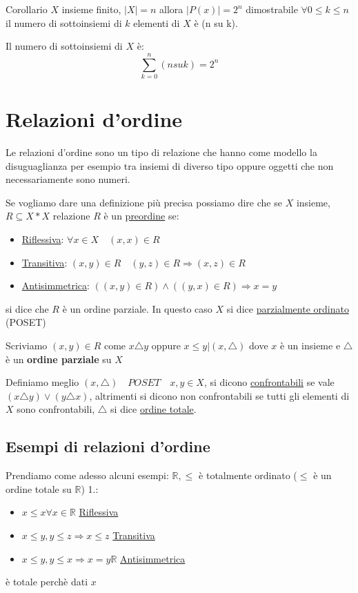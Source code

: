 \documentclass{article}
\theoremstyle{definition}
\begin{document}
Corollario $X$ insieme finito, $|X| = n$ allora $|P(x)| = 2^n$ dimostrabile $\forall 0 \le k \le n$ il numero di sottoinsiemi di $k$ elementi di $X$ è (n su k). \par
Il numero di sottoinsiemi di $X$ è: 
\begin{equation*}
        \sum_{k=0}^{n}(n su k) = 2^n
\end{equation*}






\newpage
\section{Relazioni d'ordine}
Le relazioni d'ordine sono un tipo di relazione che hanno come modello la disuguaglianza per esempio tra insiemi di diverso tipo oppure oggetti che non necessariamente sono numeri. \par
Se vogliamo dare una definizione più precisa possiamo dire che se $ X $  insieme, $ R \subseteq X * X $ relazione $ R $ è un \underline{preordine} se:
\begin{itemize}
        \item \underline{Riflessiva}: $ \forall x \in X \quad (x,x) \in R$ 
        \item \underline{Transitiva}: $ (x,y) \in R \quad (y,z)  \in R \Rightarrow (x,z) \in R$ 
        \item \underline{Antisimmetrica}: $ ((x,y) \in R) \land ((y,x) \in R) \Rightarrow x = y $ 
\end{itemize}

si dice che $ R $ è un ordine parziale. \newline
In questo caso $ X $ si dice \underline{parzialmente ordinato} (POSET) \par
Scriviamo $ (x,y) \in R $ come $ x \triangle y $ oppure $ x \le y | (x, \triangle)$  dove $x$ è un insieme e $ \triangle $ è un \textbf{ordine parziale} su $ X $    

Definiamo meglio $ (x, \triangle) \quad  POSET \quad x,y \in X$, si dicono \underline{confrontabili} se vale $ (x \triangle y) \lor (y \triangle x) $, altrimenti si dicono non confrontabili  se tutti gli elementi di $ X $ sono confrontabili, $ \triangle $ si dice \underline{ordine totale}.  \par


\subsection{Esempi di relazioni d'ordine}
Prendiamo come adesso alcuni esempi: \newline 
$ \mathbb{R}, \le $ è totalmente ordinato ($ \le $ è un ordine totale su $ \mathbb{R} $) 1.:
\begin{itemize}
        \item $ x \le x \forall x \in \mathbb{R} $ \underline{Riflessiva}
        \item $ x \le y, y \le z \Rightarrow x \le z$ \underline{Transitiva}
        \item $ x \le y, y \le x \Rightarrow x=y  \mathbb{R} $ \underline{Antisimmetrica}
\end{itemize}
è totale perchè dati $ x $ \newline
\end{document}
